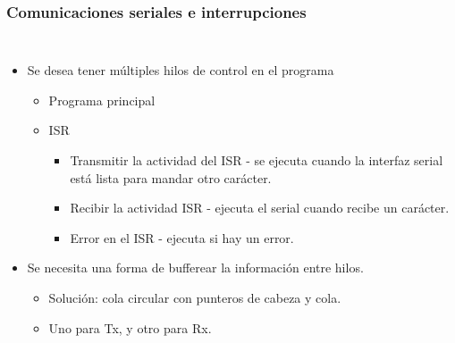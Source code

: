 \documentclass[10.5pt,scale=1.0,t,aspectratio=169,hyperref={pdfpagelabels=false}]{beamer}
\begin{document}
\begin{frame}
	\frametitle{Comunicaciones seriales e interrupciones}
	\begin{columns}
		
		\begin{itemize}
			\item Se desea tener múltiples hilos de control en el programa
			\begin{itemize}
				\item Programa principal
				\item ISR
				\begin{itemize}
					\item Transmitir la actividad del ISR - se ejecuta cuando la interfaz serial está lista para mandar otro carácter.
					\item Recibir la actividad ISR - ejecuta el serial cuando recibe un carácter. 
					\item Error en el ISR - ejecuta si hay un error.
				\end{itemize}
			\end{itemize}
			\item Se necesita una forma de bufferear la información entre hilos. 
			\begin{itemize}
				\item Solución: cola circular con punteros de cabeza y cola.
				\item Uno para Tx, y otro para Rx.
			\end{itemize}
		\end{itemize}
		
		
		

\end{columns}
\end{frame}
\end{document}
